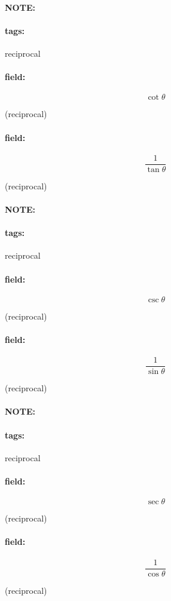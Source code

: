 \documentclass[12pt]{article}
\newenvironment{note}{\paragraph{NOTE:}}{}
\newenvironment{field}{\paragraph{field:}}{}
\newcommand*{\tags}[1]{\paragraph{tags: }#1}
\begin{document}
\begin{note}
    \tags{reciprocal}
    \begin{field}
    \[  
        \cot \theta
    \] 
    \begin{center}
    (reciprocal)
    \end{center}
    \end{field}
    \begin{field}
    \[
        \frac{1}{\tan \theta}
    \] 
    \begin{center}
    (reciprocal)
    \end{center}
    \end{field}
\end{note}


\begin{note}
    \tags{reciprocal}
    \begin{field}
    \[  
        \csc \theta
    \] 
    \begin{center}
    (reciprocal)
    \end{center}
    \end{field}
    \begin{field}
    \[
        \frac{1}{\sin \theta}
    \] 
    \begin{center}
    (reciprocal)
    \end{center}
    \end{field}
\end{note}



\begin{note}
    \tags{reciprocal}
    \begin{field}
    \[  
        \sec \theta
    \] 
    \begin{center}
    (reciprocal)
    \end{center}
    \end{field}
    \begin{field}
    \[
        \frac{1}{\cos \theta}
    \] 
    \begin{center}
    (reciprocal)
    \end{center}
    \end{field}
\end{note}
\end{document}
